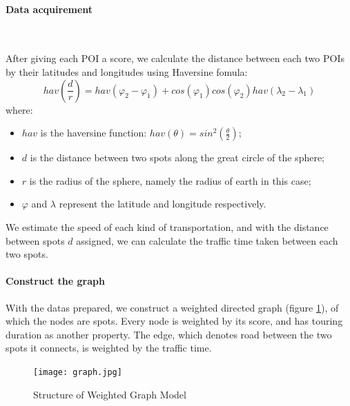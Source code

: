 \documentclass{mcmthesis}
\begin{document}
  \paragraph{Data acquirement} \

  After giving each POI a score, we calculate the distance between each two POIs by their latitudes and longitudes using Haversine fomula:
  \[
    hav(\frac{d}{r}) = hav(\varphi_{2}-\varphi_{1}) + cos(\varphi_{1})cos(\varphi_{2})hav(\lambda_{2}-\lambda_{1})
  \]
  where:
  \begin{itemize}
    \item $hav$ is the haversine function: $hav(\theta) = sin^{2}(\frac{\theta}{2})$;
    \item $d$ is the distance between two spots along the great circle of the sphere;
    \item $r$ is the radius of the sphere, namely the radius of earth in this case;
    \item $\varphi$ and $\lambda$ represent the latitude and longitude respectively.
  \end{itemize} 
  We estimate the speed of each kind of transportation, and with the distance between spots $d$ assigned, we can calculate the traffic time taken between each two spots. \par
  \paragraph{Construct the graph} 

  With the datas prepared, we construct a weighted directed graph (figure \ref{fig:graph}), of which the nodes are spots. Every node is weighted by its score, and has touring duration as another property. The edge, which denotes road between the two spots it connects, is weighted by the traffic time.
  \begin{figure}[h]
    \centering
    \texttt{[image: graph.jpg]}
    \caption{Structure of Weighted Graph Model}
    \label{fig:graph}
  \end{figure}

\end{document}
